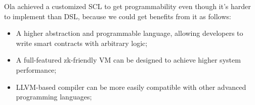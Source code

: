 Ola achieved a customized SCL to get programmability even though it's harder to implement than DSL, because we could get benefits from it as follows:
 \begin{itemize}
 \item A higher abstraction and programmable language, allowing developers to write smart contracts with arbitrary logic;
 \item A full-featured zk-friendly VM can be designed to achieve higher system performance;
 \item LLVM-based compiler can be more easily compatible with other advanced programming languages;
\end{itemize}